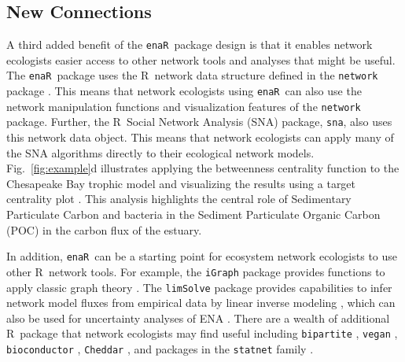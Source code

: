 \documentclass[11pt]{article}
\newcommand{\R}{R}
\newcommand{\enaR}{\texttt{enaR}}
\begin{document}
\begin{spacing}{2}
\subsection{New Connections}
A third added benefit of the \enaR\ package design is that it enables
network ecologists easier access to other network tools and analyses
that might be useful.  The \enaR\ package uses the \R\ network data
structure defined in the \texttt{network} package
\citep{butts08_network}.  This means that network ecologists using \enaR\
can also use the network manipulation functions and visualization
features of the \texttt{network} package. Further, the \R\ Social
Network Analysis (SNA) package, \texttt{sna}, \citep{butts08_social} also uses this
network data object.  This means that network ecologists can apply
many of the SNA algorithms directly to their ecological network
models.  Fig.~\ref{fig:example}d illustrates applying the betweenness
centrality function to the Chesapeake Bay trophic model
\citep{baird89} and visualizing the results using a target
centrality plot \citep{brandes03}.  This analysis highlights the
central role of Sedimentary Particulate Carbon and bacteria in the
Sediment Particulate Organic Carbon (POC) in the carbon flux of the
estuary.

In addition, \enaR\ can be a starting point for ecosystem network
ecologists to use other \R\ network tools.  For example, the
\texttt{iGraph} package provides functions to apply classic graph
theory \citep{csardi06}.  The \texttt{limSolve} package provides
capabilities to infer network model fluxes from empirical data by
linear inverse modeling \citep{soetaert09}, which can also be used for
uncertainty analyses of ENA \citep{kones09}. There are a wealth of
additional \R\ package that network ecologists may find useful
including \texttt{bipartite} \citep{dormann2008}, \texttt{vegan}
\citep{dixon2003vegan}, \texttt{bioconductor}
\citep{gentleman2004bioconductor}, \texttt{Cheddar}
\citep{hudson2013}, and packages in the \texttt{statnet} family
\citep{handcock2008statnet}.


\end{spacing}
\end{document}
